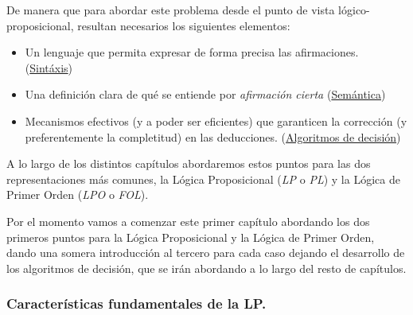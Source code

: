 \documentclass[a4paper]{report}
\begin{document}
De manera que para abordar este problema desde el punto de vista lógico-proposicional, resultan necesarios los siguientes elementos:

\begin{itemize}
\item Un lenguaje que permita expresar de forma precisa las afirmaciones. (\underline{Sintáxis})

\item Una definición clara de qué se entiende por \textit{afirmación cierta} (\underline{Semántica})

\item Mecanismos efectivos (y a poder ser eficientes) que garanticen la corrección (y preferentemente la completitud) en las deducciones. (\underline{Algoritmos de decisión})
\end{itemize}

A lo largo de los distintos capítulos abordaremos estos puntos para las dos representaciones más comunes, la Lógica Proposicional (\textit{LP} o \textit{PL}) y la Lógica de Primer Orden (\textit{LPO} o \textit{FOL}).

Por el momento vamos a comenzar este primer capítulo abordando los dos primeros puntos para la Lógica Proposicional y la Lógica de Primer Orden, dando una somera introducción al tercero para cada caso dejando el desarrollo de los algoritmos de decisión, que se irán abordando a lo largo del resto de capítulos.

\subsubsection{Características fundamentales de la LP.}
\end{document}

